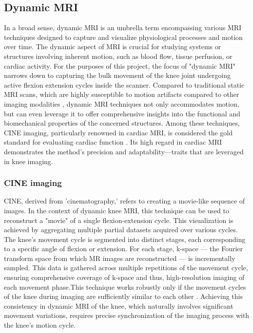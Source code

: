 \documentclass{micro-econ-thesis}
\begin{document}
\subsection{Dynamic MRI}
In a broad sense, dynamic MRI is an umbrella term encompassing various MRI techniques designed to capture and visualize physiological processes and motion over time. The dynamic aspect of MRI is crucial for studying systems or structures involving inherent motion, such as blood flow, tissue perfusion, or cardiac activity. For the purposes of this project, the focus of "dynamic MRI" narrows down to capturing the bulk movement of the knee joint undergoing active flexion extension cycles inside the scanner. Compared to traditional static MRI scans, which are highly susceptible to motion artifacts compared to other imaging modalities \parencite{zaitsev_motion_2015}, dynamic MRI techniques not only accommodates motion, but can even leverage it to offer comprehensive insights into the functional and biomechanical properties of the concerned structures.  Among these techniques, CINE imaging, particularly renowned in cardiac MRI, is considered the gold standard for evaluating cardiac function \parencite{menchon-lara_reconstruction_2019}. Its high regard in cardiac MRI demonstrates the method's precision and adaptability—traits that are leveraged in knee imaging.

\subsubsection{CINE imaging}

CINE, derived from 'cinematography,' refers to creating a movie-like sequence of images. In the context of dynamic knee MRI, this technique can be used to reconstruct a "movie" of a single flexion-extension cycle. This visualization is achieved by aggregating multiple partial datasets acquired over various cycles. The knee's movement cycle is segmented into distinct stages, each corresponding to a specific angle of flexion or extension. For each stage, k-space — the Fourier transform space from which MR images are reconstructed — is incrementally sampled. This data is gathered across multiple repetitions of the movement cycle, ensuring comprehensive coverage of k-space and thus, high-resolution imaging of each movement phase.This technique works robustly only if the movement cycles of the knee during imaging are sufficiently similar to each other \parencite{curtis_primer_2022}. Achieving this consistency in dynamic MRI of the knee, which naturally involves significant movement variations, requires precise synchronization of the imaging process with the knee's motion cycle. 
\end{document}
